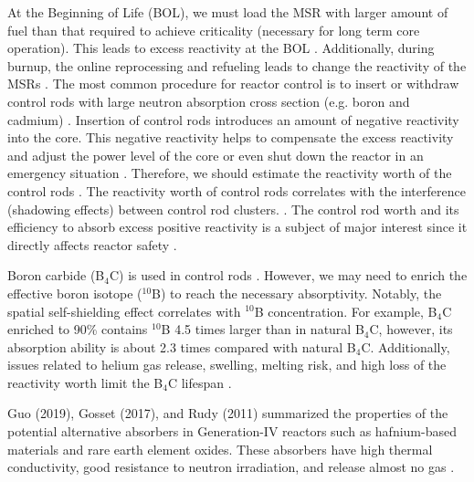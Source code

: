 At the Beginning of Life (BOL), we must load the MSR with larger amount of fuel than that required to achieve criticality (necessary for long term core operation). This leads to excess reactivity at the BOL \cite{duderstadt650nuclear}. Additionally, during burnup, the online reprocessing and refueling leads to change the reactivity of the MSRs \cite{ashraf2019whole_core}. The most common procedure for reactor control is to insert or withdraw control rods with large neutron absorption cross section (e.g. boron and cadmium) \cite{duderstadt650nuclear}. Insertion of control rods introduces an amount of negative reactivity into the core. This negative reactivity helps to compensate the excess reactivity and adjust the power level of the core or even shut down the reactor in an emergency situation \cite{glasstone1967nuclear}. Therefore, we should estimate the reactivity worth of the control rods \cite{varvayanni2009estimation,fadaei2009control,aoyama2007core,bretscher1997computing}. The reactivity worth of control rods correlates with the interference (shadowing effects) between control rod clusters. \cite{girardin2008development,vcerba2017optimization}. 
The control rod worth and its efficiency to absorb excess positive reactivity is a subject of major interest since it directly affects reactor safety \cite{liu2018criticality,atkinson2019small,vcerba2017optimization,do2019criticality,guo2019advanced,varvayanni2009estimation}.

Boron carbide (B$_4$C) is used in control rods \cite{zhong2019preliminary,steinbruck2010degradation,dunner1984absorber}. However, we may need to enrich the effective boron isotope ($^{10}$B) to reach the necessary absorptivity. Notably, the spatial self-shielding effect correlates with $^{10}$B concentration.
For example, B$_4$C enriched to 90\% contains $^{10}$B 4.5 times larger than in natural B$_4$C, however, its absorption ability is about 2.3 times compared with natural B$_4$C. Additionally, issues related to helium gas release, swelling, melting risk, and high loss of the reactivity worth limit the B$_4$C lifespan \cite{guo2019optimized}.

Guo (2019), Gosset (2017), and Rudy (2011) summarized the properties of the potential alternative absorbers in Generation-IV reactors such as hafnium-based materials and rare earth element oxides. These absorbers have high thermal conductivity, good resistance to neutron irradiation, and release almost no gas \cite{guo2019optimized,gosset2017absorber,konings2011comprehensive}.

